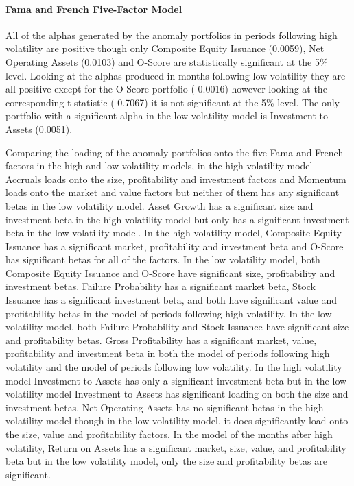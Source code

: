 \documentclass[12pt, a4paper, oneside]{article}
\begin{document}
\paragraph{Fama and French Five-Factor Model}
All of the alphas generated by the anomaly portfolios in periods following high volatility are positive though only Composite Equity Issuance (0.0059), Net Operating Assets (0.0103) and O-Score are statistically significant at the 5\% level. Looking at the alphas produced in months following low volatility they are all positive except for the O-Score portfolio (-0.0016) however looking at the corresponding t-statistic (-0.7067) it is not significant at the 5\% level. The only portfolio with a significant alpha in the low volatility model is Investment to Assets (0.0051).

Comparing the loading of the anomaly portfolios onto the five Fama and French factors in the high and low volatility models, in the high volatility model Accruals loads onto the size, profitability and investment factors and Momentum loads onto the market and value factors but neither of them has any significant betas in the low volatility model. Asset Growth has a significant size and investment beta in the high volatility model but only has a significant investment beta in the low volatility model. In the high volatility model, Composite Equity Issuance has a significant market, profitability and investment beta and O-Score has significant betas for all of the factors. In the low volatility model, both Composite Equity Issuance and O-Score have significant size, profitability and investment betas. Failure Probability has a significant market beta, Stock Issuance has a significant investment beta, and both have significant value and profitability betas in the model of periods following high volatility. In the low volatility model, both Failure Probability and Stock Issuance have significant size and profitability betas. Gross Profitability has a significant market, value, profitability and investment beta in both the model of periods following high volatility and the model of periods following low volatility. In the high volatility model Investment to Assets has only a significant investment beta but in the low volatility model Investment to Assets has significant loading on both the size and investment betas. Net Operating Assets has no significant betas in the high volatility model though in the low volatility model, it does significantly load onto the size, value and profitability factors. In the model of the months after high volatility, Return on Assets has a significant market, size, value, and profitability beta but in the low volatility model, only the size and profitability betas are significant. 
\end{document}
